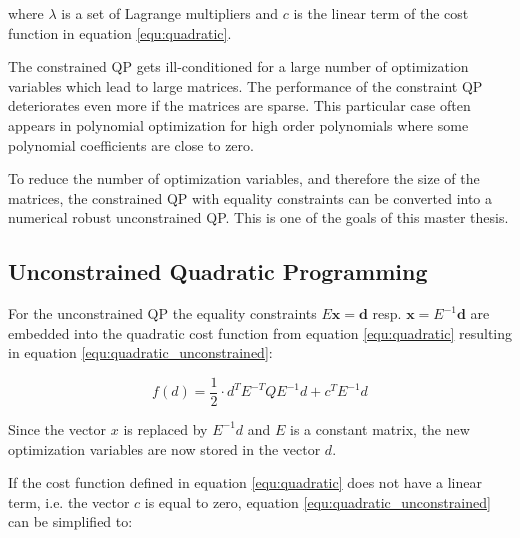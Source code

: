 where $\lambda$ is a set of Lagrange multipliers and $c$ is the linear term of the cost function in equation \ref{equ:quadratic}. \newline

The constrained QP gets ill-conditioned for a large number of optimization variables which lead to large matrices. The performance of the constraint QP deteriorates even more if the matrices are sparse. This particular case often appears in polynomial optimization for high order polynomials where some polynomial coefficients are close to zero. \newline

To reduce the number of optimization variables, and therefore the size of the matrices, the constrained QP with equality constraints can be converted into a numerical robust unconstrained QP. This is one of the goals of this master thesis.

\subsection{Unconstrained Quadratic Programming}

For the unconstrained QP the equality constraints $E \mathbf{x} = \mathbf{d}$ resp. $\mathbf{x} = E^{-1} \mathbf{d}$ are embedded into the quadratic cost function from equation \ref{equ:quadratic} resulting in equation \ref{equ:quadratic_unconstrained}:

\begin{equation}
 f(d)  = \frac{1}{2} \cdot d^T  E^{-T}  Q  E^{-1}  d + c^T  E^{-1} d
\label{equ:quadratic_unconstrained}
\end{equation}

Since the vector $x$ is replaced by $E^{-1} d$ and $E$ is a constant matrix, the new optimization variables are now stored in the vector $d$. \newline
 

If the cost function defined in equation \ref{equ:quadratic} does not have a linear term, i.e. the vector $c$ is equal to zero, equation \ref{equ:quadratic_unconstrained} can be simplified to:

